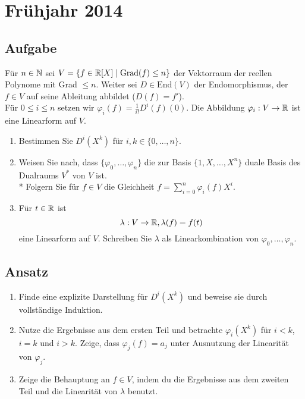 \section{Frühjahr 2014}

\subsection{Aufgabe}
Für \( n \in \mathbb{N} \) sei \( V = \{ f \in \mathbb{R}[X] \mid \text{Grad}(f) \leq n \} \) der Vektorraum der reellen Polynome mit Grad \( \leq n \). Weiter sei \( D \in \text{End}(V) \) der Endomorphismus, der \( f \in V \) auf seine Ableitung abbildet (\( D(f) = f' \)).
\\
Für \( 0 \leq i \leq n \) setzen wir \( \varphi_i(f) = \tfrac{1}{i!}D^i(f)(0) \). Die Abbildung \( \varphi_i: V \to \mathbb{R} \) ist eine Linearform auf \( V \).
\begin{enumerate}
	\item Bestimmen Sie \( D^i(X^k) \) für \( i,k \in \{ 0, \dots, n \} \).
	\item Weisen Sie nach, dass \( \{ \varphi_0, \dots, \varphi_n \} \) die zur Basis \( \{ 1, X, \dots, X^n \} \) duale Basis des Dualraums \( V^\ast \) von \( V \) ist.
		\\*
		Folgern Sie für \( f \in V \) die Gleichheit \( f = \sum_{i=0}^n \varphi_i(f)X^i \).
	\item Für \( t \in \mathbb{R} \) ist
	\begin{equation*}
		\lambda: V \to \mathbb{R}, \lambda(f) = f(t)
	\end{equation*}
	eine Linearform auf \( V \). Schreiben Sie \( \lambda \) als Linearkombination von \( \varphi_0, \dots, \varphi_n \).
\end{enumerate}

\subsection{Ansatz}
\begin{enumerate}
	\item Finde eine explizite Darstellung für \( D^i(X^k) \) und beweise sie durch vollständige Induktion.
	\item Nutze die Ergebnisse aus dem ersten Teil und betrachte \( \varphi_i(X^k) \) für \( i < k \), \( i = k \) und \( i > k \). Zeige, dass \( \varphi_j(f) = a_j \) unter Ausnutzung der Linearität von \( \varphi_j \).
	\item Zeige die Behauptung an \( f \in V \), indem du die Ergebnisse aus dem zweiten Teil und die Linearität von \( \lambda \) benutzt.
\end{enumerate}

